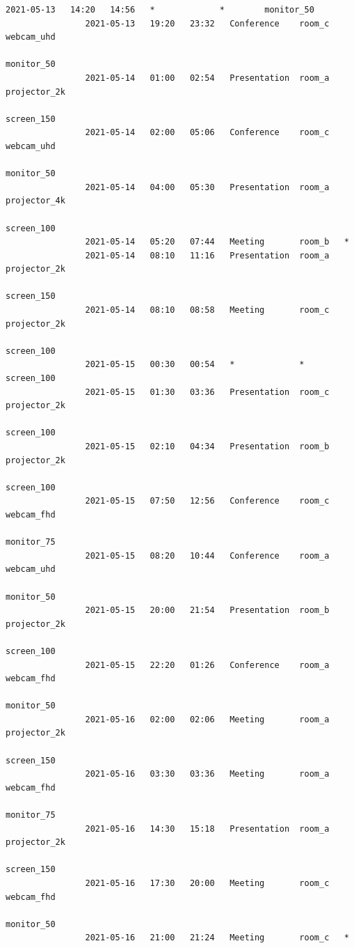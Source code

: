 \documentclass{article}
\begin{document}
\begin{Verbatim}[gobble=8]
                2021-05-13   14:20   14:56   *             *        monitor_50
                2021-05-13   19:20   23:32   Conference    room_c   webcam_uhd
                                                                    monitor_50
                2021-05-14   01:00   02:54   Presentation  room_a   projector_2k
                                                                    screen_150
                2021-05-14   02:00   05:06   Conference    room_c   webcam_uhd
                                                                    monitor_50
                2021-05-14   04:00   05:30   Presentation  room_a   projector_4k
                                                                    screen_100
                2021-05-14   05:20   07:44   Meeting       room_b   *
                2021-05-14   08:10   11:16   Presentation  room_a   projector_2k
                                                                    screen_150
                2021-05-14   08:10   08:58   Meeting       room_c   projector_2k
                                                                    screen_100
                2021-05-15   00:30   00:54   *             *        screen_100
                2021-05-15   01:30   03:36   Presentation  room_c   projector_2k
                                                                    screen_100
                2021-05-15   02:10   04:34   Presentation  room_b   projector_2k
                                                                    screen_100
                2021-05-15   07:50   12:56   Conference    room_c   webcam_fhd
                                                                    monitor_75
                2021-05-15   08:20   10:44   Conference    room_a   webcam_uhd
                                                                    monitor_50
                2021-05-15   20:00   21:54   Presentation  room_b   projector_2k
                                                                    screen_100
                2021-05-15   22:20   01:26   Conference    room_a   webcam_fhd
                                                                    monitor_50
                2021-05-16   02:00   02:06   Meeting       room_a   projector_2k
                                                                    screen_150
                2021-05-16   03:30   03:36   Meeting       room_a   webcam_fhd
                                                                    monitor_75
                2021-05-16   14:30   15:18   Presentation  room_a   projector_2k
                                                                    screen_150
                2021-05-16   17:30   20:00   Meeting       room_c   webcam_fhd
                                                                    monitor_50
                2021-05-16   21:00   21:24   Meeting       room_c   *
                

\end{Verbatim}
\end{document}
